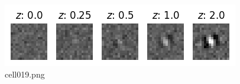 \begin{figure}[ht]
	\centering
	\includegraphics[scale=0.8, max width=\linewidth]{./fig/bayesian-brain/neural-sampling/cell019.png}
	\caption{cell019.png}
	\label{cell019.png}
\end{figure}